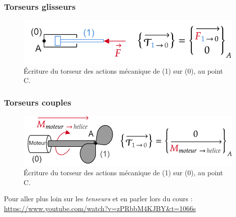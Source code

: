 \documentclass[
	11pt, %
	fleqn, %
	a4paper, %
]{LegrandOrangeBook}
\begin{document}
\subsubsection{Torseurs glisseurs}
\begin{figure}[H]  %
	\centering %
	\includegraphics[width=1\textwidth]{Images/gliss1.png} %
    \caption{Écriture du torseur des actions mécanique de (1) sur (0), au point C.}
	\label{gliss1} %
\end{figure}



\subsubsection{Torseurs couples}
\begin{figure}[H]  %
	\centering %
	\includegraphics[width=1\textwidth]{Images/couple1.png} %
    \caption{Écriture du torseur des actions mécanique de (1) sur (0), au point C.}
	\label{couple1} %
\end{figure}

Pour aller plus loin sur les \textit{tenseurs} et en parler lors du cours : \url{https://www.youtube.com/watch?v=zPRbbM4KJBY&t=1066s}
\end{document}
